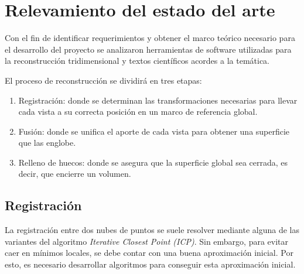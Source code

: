 \chapter{Relevamiento del estado del arte}
	Con el fin de identificar requerimientos y obtener el marco teórico
	necesario para el desarrollo del proyecto se analizaron herramientas de
	software utilizadas para la reconstrucción tridimensional y textos
	científicos acordes a la temática.

	El proceso de reconstrucción se dividirá en tres etapas:
	\begin{enumerate}
		\item Registración: donde se determinan las transformaciones necesarias
			para llevar cada vista a su correcta posición en un marco de
			referencia global.
		\item Fusión: donde se unifica el aporte de cada vista para obtener una
			superficie que las englobe.
		\item Relleno de huecos: donde se asegura que la superficie global sea
			cerrada, es decir, que encierre un volumen.
	\end{enumerate}




	\section{Registración}
		La registración entre dos nubes de puntos se suele resolver mediante
		alguna de las variantes del algoritmo \emph{Iterative Closest Point (ICP)}. 
		Sin embargo, para evitar caer en mínimos locales,
		se debe contar con una buena aproximación inicial.
		Por esto, es necesario desarrollar algoritmos para conseguir esta
		aproximación inicial.\cite{7271006}



